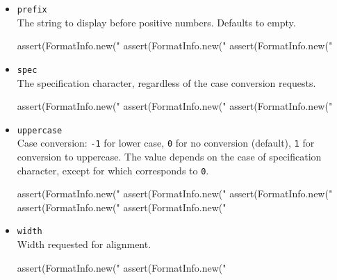 \begin{itemize}
\item \lstinline|prefix|\\
  The string to display before positive numbers.  Defaults to empty.
\begin{urbiscript}[firstnumber=last]
assert(FormatInfo.new("%
assert(FormatInfo.new("%
assert(FormatInfo.new("%
\end{urbiscript}

\item \lstinline|spec|\\
  The specification character, regardless of the case conversion
  requests.
\begin{urbiscript}[firstnumber=last]
assert(FormatInfo.new("%
assert(FormatInfo.new("%
assert(FormatInfo.new("%
\end{urbiscript}

\item \lstinline|uppercase|\\
  Case conversion: \lstinline|-1| for lower case, \lstinline|0| for no
  conversion (default), \lstinline|1| for conversion to uppercase.
  The value depends on the case of specification character, except for
   which corresponds to \lstinline|0|.
\begin{urbiscript}[firstnumber=last]
assert(FormatInfo.new("%
assert(FormatInfo.new("%
assert(FormatInfo.new("%
assert(FormatInfo.new("%
assert(FormatInfo.new("%
\end{urbiscript}

\item \lstinline|width|\\
  Width requested for alignment.
\begin{urbiscript}[firstnumber=last]
assert(FormatInfo.new("%
assert(FormatInfo.new("%
\end{urbiscript}
\end{itemize}

